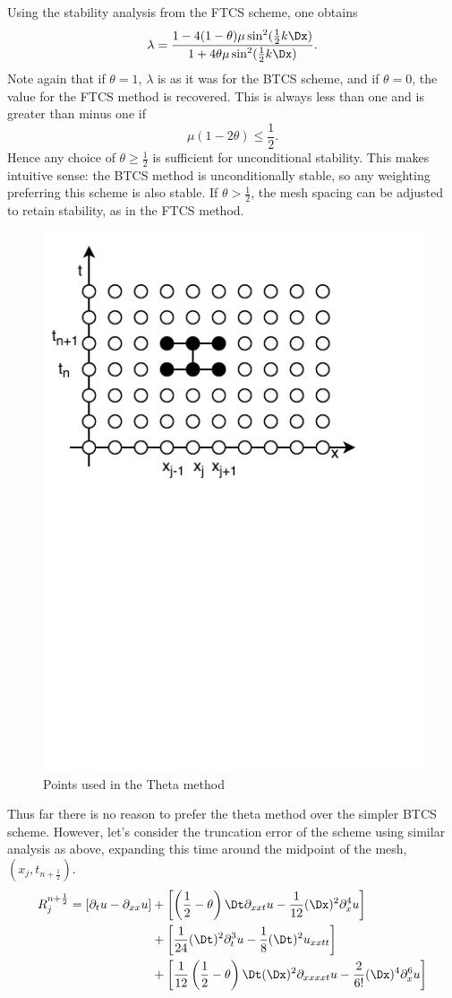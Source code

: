 Using the stability analysis from the FTCS scheme, one obtains
\[ \lambda = \frac{1-4(1-\theta)\mu\sin^2(\frac{1}{2}k\Dx)}{1+4\theta\mu\sin^2(\frac{1}{2}k\Dx)}.\]
Note again that if $\theta = 1$, $\lambda$ is as it was for the BTCS scheme, and if $\theta = 0$, the value for the FTCS method is recovered. This is always less than one and is greater than minus one if
\[\mu(1-2\theta) \leq \frac{1}{2}.\]
Hence any choice of $\theta \geq \frac{1}{2}$ is sufficient for unconditional stability. This makes intuitive sense: the BTCS method is unconditionally stable, so any weighting preferring this scheme is also stable. If $\theta > \frac{1}{2}$, the mesh spacing can be adjusted to retain stability, as in the FTCS method. 
\begin{figure}
    \centering
    \includegraphics[width=0.5\linewidth, trim={0 5cm 0 0}, clip]{Figures/CN}
    \caption[Theta Method Stencil]{Points used in the Theta method}
    \label{fig:CNmesh}
\end{figure}
Thus far there is no reason to prefer the theta method over the simpler BTCS scheme. However, let's consider the truncation error of the scheme using similar analysis as above, expanding this time around the midpoint of the mesh, $(x_j, t_{n+\frac{1}{2}})$.
    \[\begin{split}R^{n+\frac{1}{2}}_j = \lbrack \partial_t u - \partial_{xx}u\rbrack &+ \left[\left(\frac{1}{2} - \theta\right)\Dt \partial_{xxt}u - \frac{1}{12}(\Dx)^2\partial^4_{x} u\right]\\&+\left[\frac{1}{24}(\Dt)^2\partial^3_{t}u - \frac{1}{8}(\Dt)^2u_{xxtt}\right]\\
    &+\left[\frac{1}{12}\left(\frac{1}{2}-\theta\right)\Dt (\Dx)^2\partial_{xxxxt}u - \frac{2}{6!}(\Dx)^4\partial^6_xu\right]
    \end{split} \]
